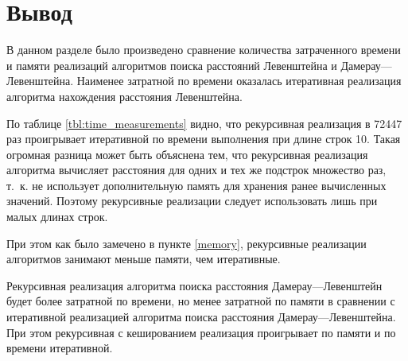 \clearpage


\section*{Вывод}

В данном разделе было произведено сравнение количества затраченного времени и памяти реализаций алгоритмов поиска расстояний Левенштейна и
Дамерау---Левенштейна. Наименее затратной по времени оказалась итеративная реализация алгоритма нахождения расстояния Левенштейна.

По таблице \ref{tbl:time_measurements} видно, что рекурсивная реализация в 72447 раз проигрывает итеративной по времени выполнения при длине строк 10. Такая огромная разница может быть объяснена тем, что рекурсивная реализация алгоритма вычисляет расстояния для одних и тех же подстрок множество раз, т.~к. не использует дополнительную память для хранения ранее вычисленных значений. Поэтому рекурсивные реализации следует использовать лишь при малых длинах строк.

При этом как было замечено в пункте \ref{memory}, рекурсивные реализации алгоритмов занимают меньше памяти, чем итеративные.

Рекурсивная реализация алгоритма поиска расстояния Дамерау---Левенштейн будет более затратной по времени, но менее затратной по памяти в сравнении с итеративной реализацией алгоритма поиска расстояния Дамерау---Левенштейна. При этом рекурсивная с кешированием реализация проигрывает по памяти и по времени итеративной.